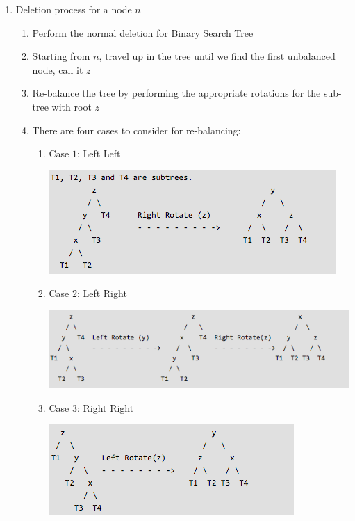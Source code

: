 \documentclass [12pt, executivepaper]{article}
\begin{document}
\begin{enumerate}
\begin{enumerate}
\item Deletion process for a node $n$

\begin{enumerate}

\item Perform the normal deletion for Binary Search Tree

\item Starting from $n$, travel up in the tree until we find the first unbalanced node, call it $z$

\item Re-balance the tree by performing the appropriate rotations for the sub-tree with root $z$

\item There are four cases to consider for re-balancing:

\begin{enumerate}

\item Case $1$: Left Left

\vspace{2mm}

\includegraphics[scale=0.5]{RotationCase1AVLTree}

\item Case $2$: Left Right

\vspace{2mm}

\includegraphics[scale=0.5]{RotationCase2AVLTree}

\item Case $3$: Right Right

\vspace{2mm}

\includegraphics[scale=0.5]{RotationCase3AVLTree}


\end{enumerate}
\end{enumerate}
\end{enumerate}
\end{enumerate}
\end{document}
